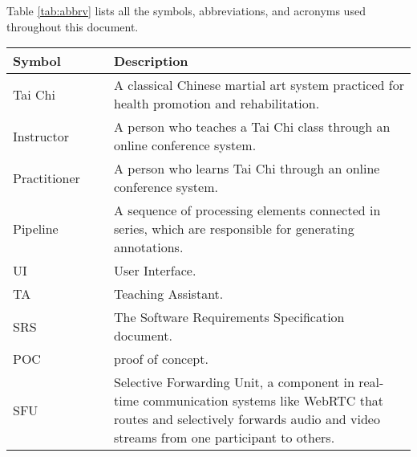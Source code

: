 \documentclass[12pt, titlepage]{article}
\begin{document}
Table \ref{tab:abbrv} lists all the symbols, abbreviations, and acronyms used
throughout this document.
\begin{table}[H]
  \centering
  \begin{tabular}{L{0.25\linewidth}L{0.8\linewidth}} \toprule
    \textbf{Symbol}        & \textbf{Description}                                                                                                                                                                     \\ \midrule
    Tai Chi          & A classical Chinese martial art system practiced for health promotion and rehabilitation.                                                                                          \\
    Instructor       & A person who teaches a Tai Chi class through an online conference system.                                                                                                          \\
    Practitioner     & A person who learns Tai Chi through an online conference system.                                                                                                                   \\
    Pipeline         & A sequence of processing elements connected in series, which are responsible for generating annotations.                                                                           \\
    UI               & User Interface.                                                                                                                                                                    \\
    TA               & Teaching Assistant.                                                                                                                                                                \\
    SRS              & The Software Requirements Specification document.                                                                                                                                  \\
    POC              & proof of concept.                                                                                                                                                                  \\
    SFU              & Selective Forwarding Unit, a component in real-time communication systems like WebRTC that routes and selectively forwards audio and video streams from one participant to others. \\

\end{tabular}
\end{table}
\end{document}
